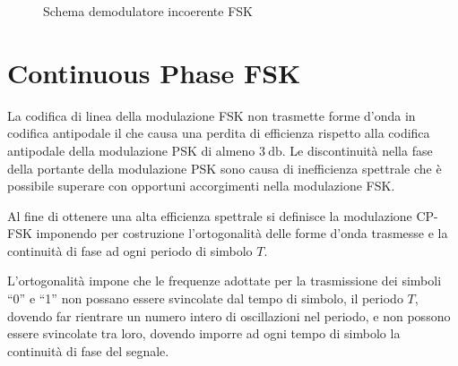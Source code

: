 \begin{figure}[!ht]\centering
{}
\caption{Schema demodulatore incoerente \ac{FSK}}
\end{figure}

\clearpage
\section{Continuous Phase \ac{FSK}}
La codifica di linea della modulazione \ac{FSK} non trasmette forme d'onda in codifica antipodale il che causa una perdita di efficienza rispetto alla codifica antipodale della modulazione \ac{PSK} di almeno $\SI{3}{\decibel}$. Le discontinuità nella fase della portante della modulazione \ac{PSK} sono causa di inefficienza spettrale che è possibile superare con opportuni accorgimenti nella modulazione \ac{FSK}.

Al fine di ottenere una alta efficienza spettrale si definisce la modulazione \ac{CP-FSK} imponendo per costruzione l'ortogonalità delle forme d'onda trasmesse e la continuità di fase ad ogni periodo di simbolo $T$.

L'ortogonalità impone che le frequenze adottate per la trasmissione dei simboli “0” e “1” non possano essere svincolate dal tempo di simbolo, il periodo $T$, dovendo far rientrare un numero intero di oscillazioni nel periodo, e non possono essere svincolate tra loro, dovendo imporre ad ogni tempo di simbolo la continuità di fase del segnale.

